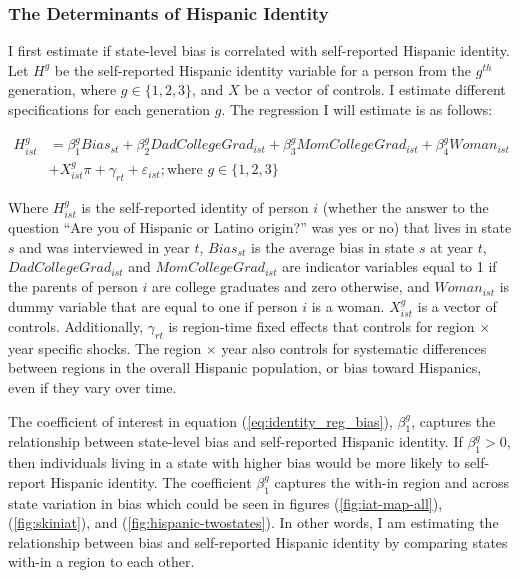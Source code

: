 \documentclass[12pt, fullpage]{article}
\begin{document}
\subsubsection{The Determinants of Hispanic Identity} %
\label{sub:the_determinants_of_hispanic_identity}

I first estimate if state-level bias is correlated with self-reported Hispanic identity. Let $H^g$ be the self-reported Hispanic identity variable for a person from the $g^{th}$ generation, where $g \in \{1,2,3\}$, and $X$ be a vector of controls. I estimate different specifications for each generation $g$. The regression I will estimate is as follows:

\begin{align}
H_{ist}^g &= \beta_1^g Bias_{st} +\beta_2^g DadCollegeGrad_{ist}+\beta_3^g MomCollegeGrad_{ist}
           + \beta_4^g Woman_{ist} \nonumber\\
           &+ X_{ist}^g\pi + \gamma_{rt} 
           + \varepsilon_{ist}; 
           \text{where } g \in \{1,2,3\} \label{eq:identity_reg_bias}
\end{align}

Where $H^g_{ist}$ is the self-reported identity of person $i$ (whether the answer to the question ``Are you of Hispanic or Latino origin?'' was yes or no) that lives in state $s$ and was interviewed in year $t$, $Bias_{st}$ is the average bias in state $s$ at year $t$, $DadCollegeGrad_{ist}$ and $MomCollegeGrad_{ist}$ are indicator variables equal to 1 if the parents of person $i$ are college graduates and zero otherwise, and $Woman_{ist}$ is dummy variable that are equal to one if person $i$ is a woman. $X_{ist}^g$ is a vector of controls. Additionally, $\gamma_{rt}$ is region-time fixed effects that controls for region $\times$ year specific shocks. The region $\times$ year also controls for systematic differences between regions in the overall Hispanic population, or bias toward Hispanics, even if they vary over time.

The coefficient of interest in equation (\ref{eq:identity_reg_bias}), $\beta_1^g$, captures the relationship between state-level bias and self-reported Hispanic identity.  If $\beta_1^g > 0$, then individuals living in a state with higher bias would be more likely to self-report Hispanic identity. The coefficient $\beta_1^g$ captures the with-in region and across state variation in bias which could be seen in figures (\ref{fig:iat-map-all}), (\ref{fig:skiniat}), and (\ref{fig:hispanic-twostates}). In other words, I am estimating the relationship between bias and self-reported Hispanic identity by comparing states with-in a region to each other.
\end{document}
